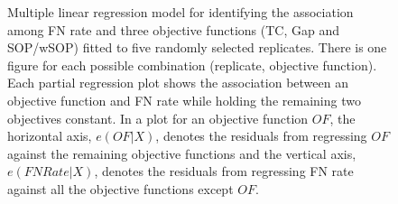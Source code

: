 \begin{figure}[!htbp]
\begin{adjustwidth}{-1cm}{-1cm}
\begin{tabular}{l||C{0.24\textwidth}|C{0.24\textwidth}|C{0.24\textwidth}|C{0.24\textwidth} }
			 & 
			 & 
			\\\hline
		\end{tabular}
	\caption{Multiple linear regression model for identifying the association among FN rate and three objective functions (TC, Gap and SOP/wSOP) fitted to five randomly selected replicates. There is one figure for each possible combination (replicate, objective function). Each partial regression plot shows the association between an objective function and FN rate while holding the remaining two objectives constant. In a plot for an objective function $ OF $, the horizontal axis, $e(OF|X)$, denotes the residuals from regressing $OF$ against the remaining objective functions and the vertical axis, $e(FNRate|X)$, denotes the residuals from regressing FN rate against all the objective functions except $ OF $.} 
	\label{fig:mul_lin_reg}
	\end{adjustwidth}
\end{figure}

